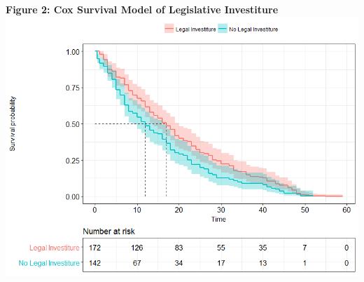 \documentclass[12pt]{article}\usepackage[]{graphicx}\usepackage[]{color}
\begin{document}
\begin{flushleft}
\clearpage
\begin{center}
\textbf{Figure 2: Cox Survival Model of Legislative Investiture}
\includegraphics[scale=.65]{Cox}
\end{center}



\end{flushleft}
\end{document}
